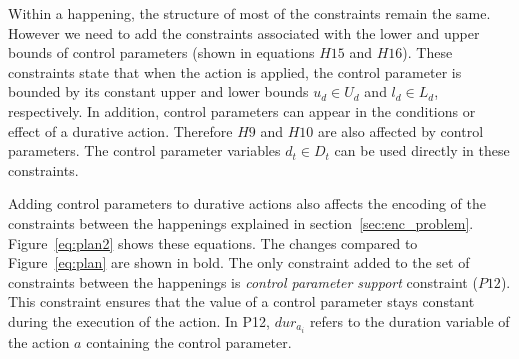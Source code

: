 Within a happening, the structure of most of the constraints remain the same. However we need to add the constraints associated with the lower and upper bounds of control parameters (shown in equations $H15$ and $H16$). These constraints state that when the action is applied, the control parameter is bounded by its constant upper and lower bounds $u_d\in U_d$ and $l_d \in L_d$, respectively. In addition, control parameters can appear in the conditions or effect of a durative action. Therefore $H9$ and $H10$ are also affected by control parameters. The control parameter variables $d_t\in D_t$ can be used directly in these constraints.

Adding control parameters to durative actions also affects the encoding of the constraints between the happenings explained in section~\ref{sec:enc_problem}. Figure~\ref{eq:plan2} shows these equations. The changes compared to Figure~\ref{eq:plan} are shown in bold.
The only constraint added to the set of constraints between the happenings is \textit{control parameter support} constraint ($P12$). This constraint ensures that the value of a control parameter stays constant during the execution of the action. In P12, $dur_{a_i}$ refers to the duration variable of the action $a$ containing the control parameter.


